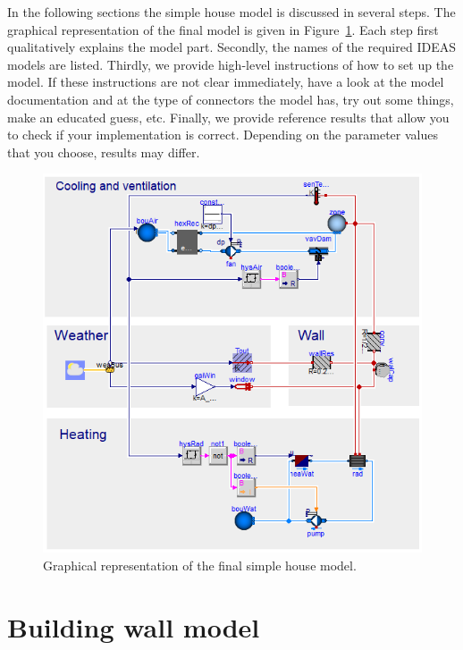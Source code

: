 \documentclass[10pt,a4paper]{article}
\begin{document}
In the following sections the simple house model is discussed 
in several steps. The graphical representation of the final model is 
given in Figure~\ref{fig:simpleHouse}.
Each step first qualitatively explains the model part.
Secondly, the names of the required IDEAS models 
are listed.
Thirdly, we provide high-level instructions of how to
set up the model.
If these instructions are not clear immediately, 
have a look at the model documentation and at the type of
connectors the model has, 
try out some things, 
make an educated guess, etc.
Finally, we provide reference results that allow you to check
if your implementation is correct. 
Depending on the parameter values that you choose, results
may differ.
 
\begin{figure}[h!]
\centering
\includegraphics[scale=0.46]{simpleHouse.png}
\caption{Graphical representation of the final simple house model.}
\label{fig:simpleHouse}
\end{figure}


\section{Building wall model}
\end{document}
